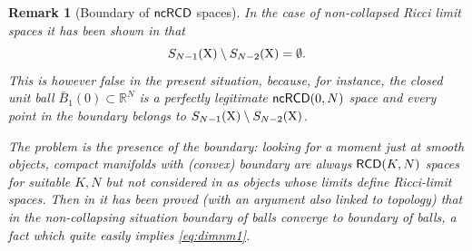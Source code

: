 \documentclass[reqno,11pt]{article}
\numberwithin{equation}{section}
\newcommand{\R}{\mathbb{R}}
\newtheorem{remark}[theorem]{Remark}
\newcommand{\X}{{\rm X}}
\newcommand{\RCD}{{\sf RCD}}
\newcommand{\ncRCD}{{\sf ncRCD}}
\begin{document}
\begin{remark}[Boundary of $\ncRCD$ spaces]{\rm In the case of non-collapsed Ricci limit spaces it has been shown in \cite{Cheeger-Colding97I} that 
\begin{equation}
\label{eq:dimnm1}
S_{N-1}(\X)\setminus S_{N-2}(\X)=\emptyset.
\end{equation}
This is however false in the present situation, because, for instance, the closed unit ball $\bar B_1(0)\subset \R^N$ is a perfectly legitimate $\ncRCD(0,N)$ space and every point in the boundary belongs to $S_{N-1}(\X)\setminus S_{N-2}(\X)$.

The problem is the presence of the boundary: looking for a moment just at smooth objects, compact manifolds with (convex) boundary are always $\RCD(K,N)$ spaces for suitable $K,N$ but not considered in \cite{Cheeger-Colding97I} as objects whose limits define Ricci-limit spaces. Then in \cite{Cheeger-Colding97I} it has been proved (with an argument also linked to topology) that in the non-collapsing situation  boundary of balls converge to  boundary of balls, a fact which quite easily implies \eqref{eq:dimnm1}.

}
\end{remark}
\end{document}
